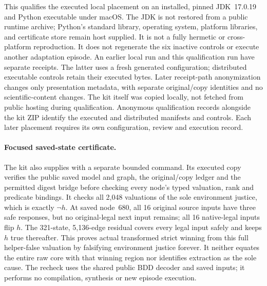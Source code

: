 This qualifies the executed local placement on an installed, pinned
JDK~17.0.19 and Python executable under macOS. The JDK is not restored
from a public runtime archive; Python's standard library, operating
system, platform libraries, and certificate store remain host supplied.
It is not a fully hermetic or cross-platform reproduction. It does not
regenerate the six inactive controls or execute another adaptation
episode. An earlier local run and this qualification run have
separate receipts. The latter uses a fresh generated configuration;
distributed executable controls retain their executed bytes. Later
receipt-path anonymization changes only presentation metadata, with
separate original/copy identities and no scientific-content changes.
The kit itself was
copied locally, not fetched from public hosting during qualification.
Anonymous qualification records alongside the kit ZIP identify the
executed and distributed manifests and controls. Each later placement requires its own
configuration, review and execution record.

\paragraph{Focused saved-state certificate.}
The kit also supplies  with a separate
bounded command. Its executed copy verifies the public saved model and
graph, the original/copy ledger and the permitted digest bridge before
checking every node's typed valuation, rank and predicate bindings.
It checks all 2,048 valuations of the sole environment justice, which
is exactly $\neg h$. At saved node~680, all 16 original source inputs
have three safe responses, but no original-legal next input remains;
all 16 native-legal inputs flip $h$.
The 321-state, 5,136-edge residual covers every legal input safely and
keeps $h$ true thereafter. This proves actual transformed strict winning
from this full helper-false valuation by falsifying environment justice
forever. It neither equates the entire raw core with that winning
region nor identifies extraction as the sole cause. The recheck uses
the shared public BDD decoder and saved inputs; it performs no
compilation, synthesis or new episode execution.

